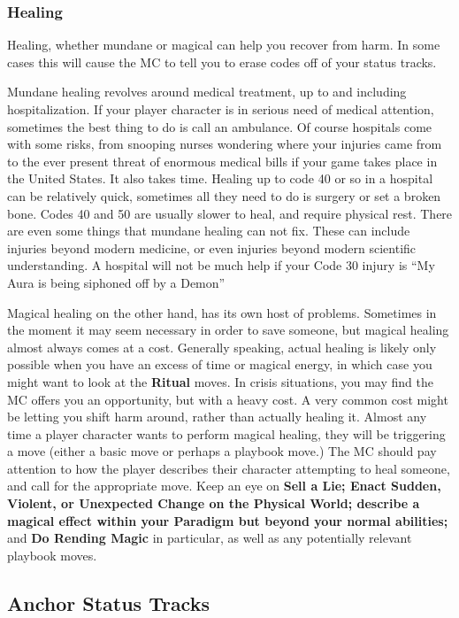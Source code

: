 \documentclass[
]{article}
\begin{document}
\hypertarget{healing}{%
\subsubsection{Healing}\label{healing}}

Healing, whether mundane or magical can help you recover from harm. In
some cases this will cause the MC to tell you to erase codes off of your
status tracks.

Mundane healing revolves around medical treatment, up to and including
hospitalization. If your player character is in serious need of medical
attention, sometimes the best thing to do is call an ambulance. Of
course hospitals come with some risks, from snooping nurses wondering
where your injuries came from to the ever present threat of enormous
medical bills if your game takes place in the United States. It also
takes time. Healing up to code 40 or so in a hospital can be relatively
quick, sometimes all they need to do is surgery or set a broken bone.
Codes 40 and 50 are usually slower to heal, and require physical rest.
There are even some things that mundane healing can not fix. These can
include injuries beyond modern medicine, or even injuries beyond modern
scientific understanding. A hospital will not be much help if your Code
30 injury is ``My Aura is being siphoned off by a Demon''

Magical healing on the other hand, has its own host of problems.
Sometimes in the moment it may seem necessary in order to save someone,
but magical healing almost always comes at a cost. Generally speaking,
actual healing is likely only possible when you have an excess of time
or magical energy, in which case you might want to look at the
\textbf{Ritual} moves. In crisis situations, you may find the MC offers
you an opportunity, but with a heavy cost. A very common cost might be
letting you shift harm around, rather than actually healing it. Almost
any time a player character wants to perform magical healing, they will
be triggering a move (either a basic move or perhaps a playbook move.)
The MC should pay attention to how the player describes their character
attempting to heal someone, and call for the appropriate move. Keep an
eye on \textbf{Sell a Lie; Enact Sudden, Violent, or Unexpected Change
on the Physical World; describe a magical effect within your Paradigm
but beyond your normal abilities; }and \textbf{Do Rending Magic} in
particular, as well as any potentially relevant playbook moves.

\hypertarget{anchor-status-tracks}{%
\subsection{Anchor Status Tracks}\label{anchor-status-tracks}}
\end{document}
